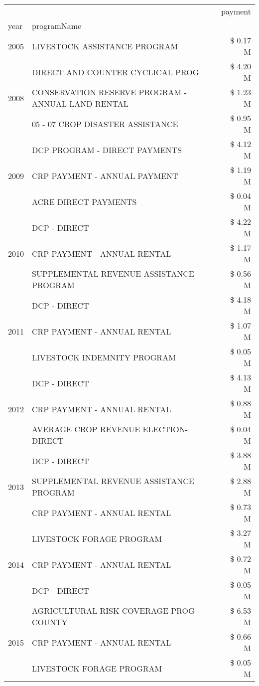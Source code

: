 \begin{tabular}{llr}
\toprule
 &  & payment \\
year & programName &  \\
\midrule
2005 & LIVESTOCK ASSISTANCE PROGRAM & \$ 0.17 M \\
\cline{1-3}
\multirow[t]{3}{*}{2008} & DIRECT AND COUNTER CYCLICAL PROG & \$ 4.20 M \\
 & CONSERVATION RESERVE PROGRAM - ANNUAL LAND RENTAL & \$ 1.23 M \\
 & 05 - 07 CROP DISASTER ASSISTANCE & \$ 0.95 M \\
\cline{1-3}
\multirow[t]{3}{*}{2009} & DCP PROGRAM - DIRECT PAYMENTS & \$ 4.12 M \\
 & CRP PAYMENT - ANNUAL PAYMENT & \$ 1.19 M \\
 & ACRE DIRECT PAYMENTS & \$ 0.04 M \\
\cline{1-3}
\multirow[t]{3}{*}{2010} & DCP - DIRECT & \$ 4.22 M \\
 & CRP PAYMENT - ANNUAL RENTAL & \$ 1.17 M \\
 & SUPPLEMENTAL REVENUE ASSISTANCE PROGRAM & \$ 0.56 M \\
\cline{1-3}
\multirow[t]{3}{*}{2011} & DCP - DIRECT & \$ 4.18 M \\
 & CRP PAYMENT - ANNUAL RENTAL & \$ 1.07 M \\
 & LIVESTOCK INDEMNITY PROGRAM & \$ 0.05 M \\
\cline{1-3}
\multirow[t]{3}{*}{2012} & DCP - DIRECT & \$ 4.13 M \\
 & CRP PAYMENT - ANNUAL RENTAL & \$ 0.88 M \\
 & AVERAGE CROP REVENUE ELECTION-DIRECT & \$ 0.04 M \\
\cline{1-3}
\multirow[t]{3}{*}{2013} & DCP - DIRECT & \$ 3.88 M \\
 & SUPPLEMENTAL REVENUE ASSISTANCE PROGRAM & \$ 2.88 M \\
 & CRP PAYMENT - ANNUAL RENTAL & \$ 0.73 M \\
\cline{1-3}
\multirow[t]{3}{*}{2014} & LIVESTOCK FORAGE PROGRAM & \$ 3.27 M \\
 & CRP PAYMENT - ANNUAL RENTAL & \$ 0.72 M \\
 & DCP - DIRECT & \$ 0.05 M \\
\cline{1-3}
\multirow[t]{3}{*}{2015} & AGRICULTURAL RISK COVERAGE PROG - COUNTY & \$ 6.53 M \\
 & CRP PAYMENT - ANNUAL RENTAL & \$ 0.66 M \\
 & LIVESTOCK FORAGE PROGRAM & \$ 0.05 M \\

\end{tabular}
